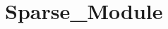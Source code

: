 \hypertarget{group___sparse___module}{}\section{Sparse\+\_\+\+Module}
\label{group___sparse___module}
